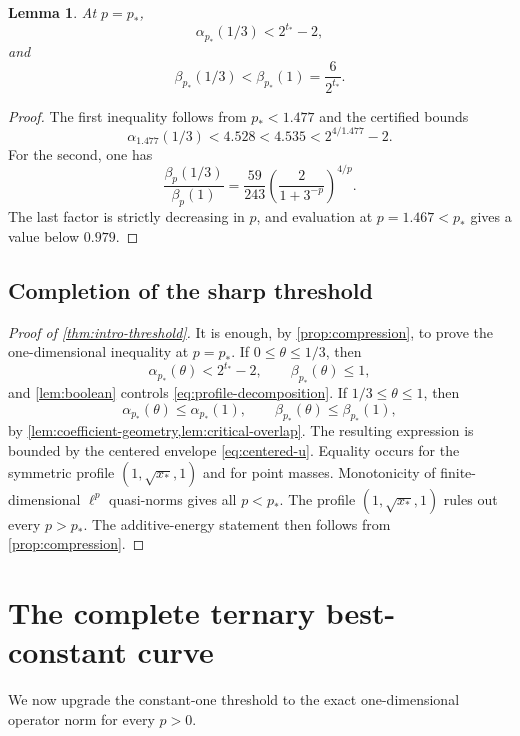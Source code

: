\documentclass[11pt,reqno]{amsart}
\numberwithin{equation}{section}
\newtheorem{lemma}[lemma]{Lemma}
\theoremstyle{definition}
\theoremstyle{remark}
\begin{document}
\begin{lemma}\label{lem:critical-overlap}
At $p=p_*$,
\begin{equation}\label{eq:critical-overlap-alpha}
  \alpha_{p_*}(1/3)<2^{t_*}-2,
\end{equation}
and
\begin{equation}\label{eq:critical-overlap-beta}
  \beta_{p_*}(1/3)<\beta_{p_*}(1)=\frac6{2^{t_*}}.
\end{equation}
\end{lemma}

\begin{proof}
The first inequality follows from $p_*<1.477$ and the certified bounds
\[
  \alpha_{1.477}(1/3)<4.528<4.535<2^{4/1.477}-2.
\]
For the second, one has
\[
  \frac{\beta_p(1/3)}{\beta_p(1)}
  =\frac{59}{243}
  \left(\frac2{1+3^{-p}}\right)^{4/p}.
\]
The last factor is strictly decreasing in $p$, and evaluation at
$p=1.467<p_*$ gives a value below $0.979$.
\end{proof}

\subsection{Completion of the sharp threshold}

\begin{proof}[Proof of \cref{thm:intro-threshold}]
It is enough, by \cref{prop:compression}, to prove the one-dimensional
inequality at $p=p_*$.  If $0\le\theta\le1/3$, then
\[
  \alpha_{p_*}(\theta)<2^{t_*}-2,
  \qquad
  \beta_{p_*}(\theta)\le1,
\]
and \cref{lem:boolean} controls \eqref{eq:profile-decomposition}.
If $1/3\le\theta\le1$, then
\[
  \alpha_{p_*}(\theta)\le\alpha_{p_*}(1),
  \qquad
  \beta_{p_*}(\theta)\le\beta_{p_*}(1),
\]
by \cref{lem:coefficient-geometry,lem:critical-overlap}.  The resulting
expression is bounded by the centered envelope
\eqref{eq:centered-u}.  Equality occurs for the symmetric profile
$(1,\sqrt{x_*},1)$ and for point masses.  Monotonicity of finite-dimensional
$\ell^p$ quasi-norms gives all $p<p_*$.  The profile
$(1,\sqrt{x_*},1)$ rules out every $p>p_*$.  The additive-energy statement
then follows from \cref{prop:compression}.
\end{proof}

\section{The complete ternary best-constant curve}

We now upgrade the constant-one threshold to the exact one-dimensional operator
norm for every $p>0$.
\end{document}
